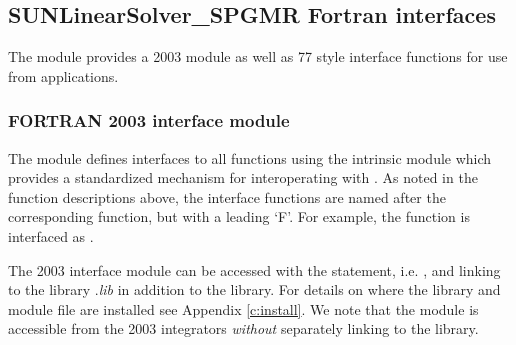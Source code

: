 \subsection{SUNLinearSolver\_SPGMR Fortran interfaces}
\label{ss:sunlinsol_spgmr_fortran}

The {\sunlinsolspgmr} module provides a {\F} 2003 module as well as {\F} 77
style interface functions for use from {\F} applications.

\subsubsection*{FORTRAN 2003 interface module}
The  {\F} module defines interfaces to all
{\sunlinsolspgmr} {\CC} functions using the intrinsic 
module which provides a standardized mechanism for interoperating with {\CC}. As
noted in the {\CC} function descriptions above, the interface functions are
named after the corresponding {\CC} function, but with a leading `F'. For
example, the function  is interfaced as
.

The {\F} 2003 {\sunlinsolspgmr} interface module can be accessed with the 
statement, i.e. , and linking to the library
.{\em lib} in addition to the {\CC} library.
For details on where the library and module file
 are installed see Appendix \ref{c:install}.
We note that the module is accessible from the {\F} 2003 {\sundials} integrators
\textit{without} separately linking to the
 library.

